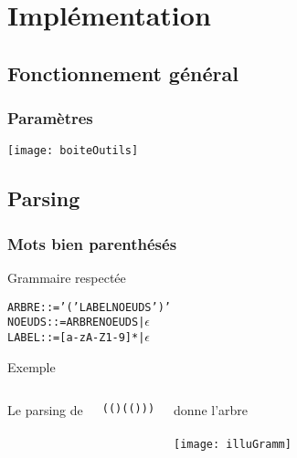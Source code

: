 \section{Implémentation}

\subsection{Fonctionnement général}

\begin{frame}
    \frametitle{Paramètres}
	\texttt{[image: boiteOutils]}
\end{frame}

\subsection{Parsing}

\begin{frame}[fragile]
    \frametitle{Mots bien parenthésés}
    \begin{block}{Grammaire respectée}
    \begin{alltt}
        ARBRE ::= '(' LABEL NOEUDS ')'
        NOEUDS ::= ARBRE NOEUDS | \(\epsilon\)
        LABEL ::= [a-zA-Z1-9]* | \(\epsilon\)
    \end{alltt}
    \end{block}
    \begin{exampleblock}{Exemple}
    \begin{columns}[t]
		Le parsing de \\
		\centering
	    \begin{alltt}
	    (()(()))
	    \end{alltt}
		donne l'arbre\\
		~\\
		\texttt{[image: illuGramm]}
		\end{columns}
    \end{exampleblock}
\end{frame}

